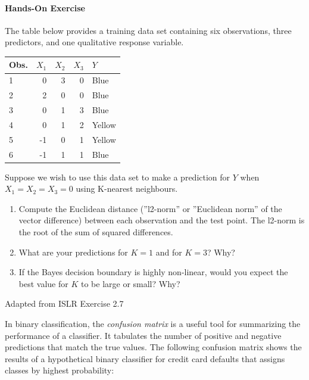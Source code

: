 \begin{tcolorbox}[colback=code]
\paragraph*{Hands-On Exercise} 

The table below provides a training data set containing six observations, three predictors, and one qualitative response variable.\\ 
\vspace{.5\baselineskip}
\begin{center}
\footnotesize
\renewcommand{\arraystretch}{1.1}
\begin{tabular}{l|r|r|r|l} \hline
Obs. & $X_1$ & $X_2$ & $X_3$ & $Y$ \\ \hline
1 & 0 & 3 & 0 & Blue \\
2 & 2 & 0 & 0 & Blue \\
3 & 0 & 1 & 3 & Blue \\
4 & 0 & 1 & 2 & Yellow \\
5 & -1 & 0 & 1 & Yellow \\
6 & -1 & 1 & 1 & Blue \\ \hline
\end{tabular}
\end{center}

\vspace{.5\baselineskip}
Suppose we wish to use this data set to make a prediction for $Y$ when $X_1=X_2=X_3=0$ using K-nearest neighbours.
\vspace{.5\baselineskip}
\begin{enumerate}
  \item Compute the Euclidean distance (''l2-norm'' or ''Euclidean norm'' of the vector difference) between each observation and the test point. The l2-norm is the root of the sum of squared differences.
  \item What are your predictions for $K=1$ and for $K=3$? Why?
  \item If the Bayes decision boundary is highly non-linear, would you expect the best value for $K$ to be large or small? Why?
\end{enumerate}

\vspace{.5\baselineskip}\scriptsize Adapted from ISLR Exercise 2.7
\end{tcolorbox}

In binary classification, the \emph{confusion matrix} is a useful tool for summarizing the performance of a classifier. It tabulates the number of positive and negative predictions that match the true values. The following confusion matrix shows the results of a hypothetical binary classifier for credit card defaults that assigns classes by highest probability:

